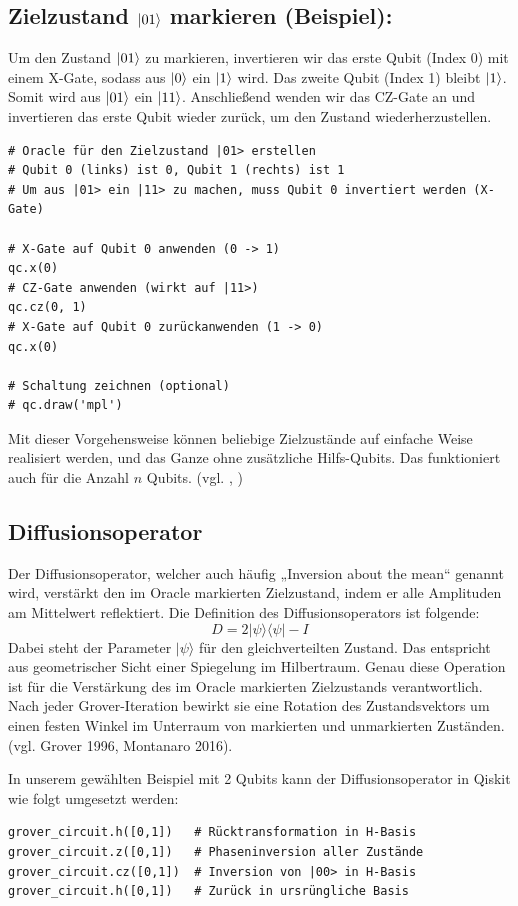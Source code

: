 \subsection*{Zielzustand $\ket{01}$ markieren (Beispiel):}
Um den Zustand $\ket{01}$ zu markieren, invertieren wir das erste Qubit (Index 0) mit einem X-Gate, sodass aus $\ket{0}$ ein $\ket{1}$ wird. Das zweite Qubit (Index 1) bleibt $\ket{1}$. Somit wird aus $\ket{01}$ ein $\ket{11}$. Anschließend wenden wir das CZ-Gate an und invertieren das erste Qubit wieder zurück, um den Zustand wiederherzustellen.

\begin{verbatim}
# Oracle für den Zielzustand |01> erstellen
# Qubit 0 (links) ist 0, Qubit 1 (rechts) ist 1
# Um aus |01> ein |11> zu machen, muss Qubit 0 invertiert werden (X-Gate)

# X-Gate auf Qubit 0 anwenden (0 -> 1)
qc.x(0)
# CZ-Gate anwenden (wirkt auf |11>)
qc.cz(0, 1)
# X-Gate auf Qubit 0 zurückanwenden (1 -> 0)
qc.x(0)

# Schaltung zeichnen (optional)
# qc.draw('mpl')
\end{verbatim}
Mit dieser Vorgehensweise können beliebige Zielzustände auf einfache Weise realisiert werden, und das Ganze ohne zusätzliche Hilfs-Qubits. Das funktioniert auch für die Anzahl $n$ Qubits. 
(vgl. \citeauthor{roy_deterministic_2022}, \citeyear{roy_deterministic_2022})



\subsection*{Diffusionsoperator}
Der Diffusionsoperator, welcher auch häufig „Inversion about the mean“ genannt wird, verstärkt den im Oracle markierten Zielzustand, indem er alle Amplituden am Mittelwert reflektiert. Die Definition des Diffusionsoperators ist folgende:
$$
D = 2|\psi\rangle\langle\psi| - I
$$
Dabei steht der Parameter $|\psi\rangle$ für den gleichverteilten Zustand. Das entspricht aus geometrischer Sicht einer Spiegelung im Hilbertraum. Genau diese Operation ist für die Verstärkung des im Oracle markierten Zielzustands verantwortlich. Nach jeder Grover-Iteration bewirkt sie eine Rotation des Zustandsvektors um einen festen Winkel im Unterraum von markierten und unmarkierten Zuständen. (vgl. Grover 1996, Montanaro 2016).

In unserem gewählten Beispiel mit 2 Qubits kann der Diffusionsoperator in Qiskit wie folgt umgesetzt werden:
\begin{verbatim}
grover_circuit.h([0,1])   # Rücktransformation in H-Basis
grover_circuit.z([0,1])   # Phaseninversion aller Zustände
grover_circuit.cz([0,1])  # Inversion von |00> in H-Basis
grover_circuit.h([0,1])   # Zurück in ursrüngliche Basis
\end{verbatim}

